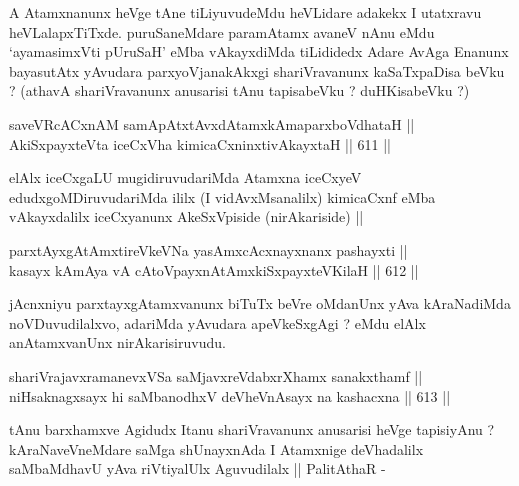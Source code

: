 \begin{artha}
A Atamxnanunx heVge tAne tiLiyuvudeMdu heVLidare adakekx I utatxravu
heVLalapxTiTxde. puruSaneMdare paramAtamx avaneV nAnu eMdu
`ayamasimxVti pUruSaH' eMba vAkayxdiMda tiLididedx Adare AvAga Enanunx
bayasutAtx yAvudara parxyoVjanakAkxgi shariVravanunx kaSaTxpaDisa
beVku ? (athavA shariVravanunx anusarisi tAnu tapisabeVku ?
duHKisabeVku ?)
\end{artha}


\begin{shl}
saveVRcACxnAM samApAtxtAvxdAtamxkAmaparxboVdhataH || \\
AkiSxpayxteV\s ta iceCxVha kimicaCxninxtivAkayxtaH ||  611 ||  
\end{shl}

\begin{artha}
elAlx iceCxgaLU mugidiruvudariMda Atamxna iceCxyeV
edudxgoMDiruvudariMda ililx (I vidAvxMsanalilx) kimicaCxnf eMba
vAkayxdalilx iceCxyanunx AkeSxVpiside (nirAkariside) ||
\end{artha}


\begin{shl}
parxtAyxgAtAmxtireVkeVNa yasAmxcAcxnayxnanx pashayxti || \\
kasayx kAmAya vA cAtoV\s payxnAtAmx\s \s kiSxpayxteV\s KilaH ||  612 ||  
\end{shl}

\begin{artha}
jAcnxniyu parxtayxgAtamxvanunx biTuTx beVre oMdanUnx yAva kAraNadiMda
noVDuvudilalxvo, adariMda yAvudara apeVkeSxgAgi ? eMdu elAlx
anAtamxvanUnx nirAkarisiruvudu.
\end{artha}


\begin{shl}
shariVrajavxramanevxVSa saMjavxreVdabxrXhamx sanakxthamf || \\
niHsaknagxsayx hi saMbanodhxV deVheVnAsayx na kashacxna ||  613 ||  
\end{shl}

\begin{artha}
tAnu barxhamxve Agidudx Itanu shariVravanunx anusarisi heVge
tapisiyAnu ? kAraNaveVneMdare saMga shUnayxnAda I Atamxnige
deVhadalilx saMbaMdhavU yAva riVtiyalUlx Aguvudilalx || PalitAthaR -
\end{artha}

